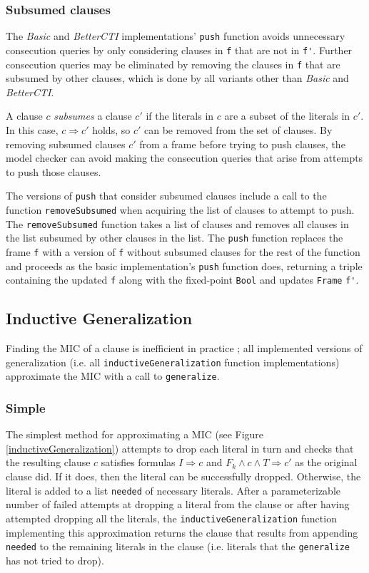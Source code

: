 \documentclass[12pt,a4paper,twoside,openright]{report}
\begin{document}
{{\subsubsection{Subsumed clauses}
The \emph{Basic} and \emph{BetterCTI} implementations' \verb,push, function avoids unnecessary
consecution queries by only considering clauses in \verb,f, that are not in \verb,f',.
Further consecution queries may be eliminated by removing the clauses in \verb,f,
that are subsumed by other clauses, which is done by all variants other than {\it Basic}
and \emph{BetterCTI}.

A clause $c$ \emph{subsumes} a clause $c'$ if the literals in $c$ are a subset of the literals
in $c'$. In this case, $c \Rightarrow c'$ holds, so $c'$ can be removed from the set of clauses. By
removing subsumed clauses $c'$ from a frame before trying to push clauses, the model
checker can avoid making the consecution queries that arise from attempts to push those clauses.

The versions of \verb,push, that consider subsumed clauses include a call to the function
\verb,removeSubsumed, when acquiring the list of clauses to attempt to push.
The \verb,removeSubsumed, function takes a list of clauses and removes all clauses in the list
subsumed by other clauses in the list.
The \verb,push, function replaces the frame
\verb,f, with a version of \verb,f, without subsumed clauses
for the rest of the function and proceeds as the basic implementation's \verb,push, function does,
returning a triple containing the updated \verb,f, along with the fixed-point \verb,Bool,
and updates \verb,Frame, \verb,f',.

\subsection{Inductive Generalization}
\label{impl:generalization}
Finding the MIC of a clause is inefficient in practice
\cite{griggio14};
all implemented versions of generalization
(i.e. all \verb,inductiveGeneralization, function implementations) approximate the MIC with a call to
\verb,generalize,.

\subsubsection{Simple}
The simplest method for approximating a MIC (see Figure \ref{inductiveGeneralization})
attempts to drop each literal in turn and checks
that the resulting clause $c$ satisfies formulas $I \Rightarrow c$ and
$F_k \wedge c \wedge T \Rightarrow c'$ as the original clause did.
If it does, then the literal can be successfully dropped.
Otherwise, the literal is added to a list \verb,needed, of necessary literals.
After a parameterizable number of failed attempts at dropping a literal from the clause or after
having attempted dropping all the literals, the
\verb,inductiveGeneralization, function implementing this approximation
returns the clause that results from appending \verb,needed, to the remaining
literals in the clause (i.e. literals that the \verb,generalize, has not tried to drop).

}}
\end{document}
